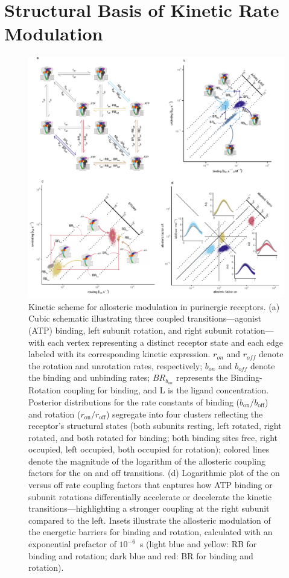 \documentclass[pdflatex,sn-mathphys-num]{sn-jnl}%
\theoremstyle{thmstyleone}%
\theoremstyle{thmstyletwo}%
\theoremstyle{thmstylethree}%
\begin{document}
\section{Structural Basis of Kinetic Rate Modulation}
\begin{figure}[!htbp]
	\centering
	\includegraphics[width=\linewidth]{Figure_3_scheme_10.pdf}
	\caption{Kinetic scheme for allosteric modulation in purinergic receptors. (a) Cubic schematic illustrating three coupled transitions---agonist (ATP) binding, left subunit rotation, and right subunit rotation---with each vertex representing a distinct receptor state and each edge labeled with its corresponding kinetic expression. $r_{on}$ and $r_{off}$ denote the rotation and unrotation rates, respectively; $b_{on}$ and $b_{off}$ denote the binding and unbinding rates; $BR_{b_{on}}$ represents the Binding-Rotation coupling for binding, and L is the ligand concentration. Posterior distributions for the rate constants of binding ($b_{\text{on}}/b_{\text{off}}$) and rotation ($r_{\text{on}}/r_{\text{off}}$) segregate into four clusters reflecting the receptor's structural states (both subunits resting, left rotated, right rotated, and both rotated for binding; both binding sites free, right occupied, left occupied, both occupied for rotation); colored lines denote the magnitude of the logarithm of the allosteric coupling factors for the on and off transitions. (d) Logarithmic plot of the on versus off rate coupling factors that captures how ATP binding or subunit rotations differentially accelerate or decelerate the kinetic transitions---highlighting a stronger coupling at the right subunit compared to the left. Insets illustrate the allosteric modulation of the energetic barriers for binding and rotation, calculated with an exponential prefactor of $10^{-6}$~s (light blue and yellow: RB for binding and rotation; dark blue and red: BR for binding and rotation).}
	\label{fig:rates_SchemeX}
\end{figure}
\end{document}
